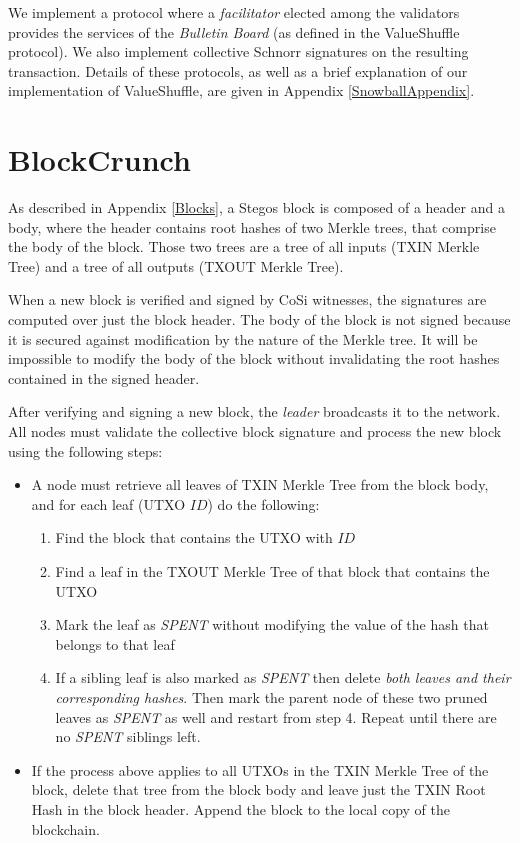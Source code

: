 \documentclass[a4paper, 10pt, conference]{ieeeconf}
\begin{document}
We implement a protocol where a \textit{facilitator} elected among the validators provides the services of the \textit{Bulletin Board} (as defined in the ValueShuffle protocol). We also implement collective Schnorr signatures\cite{c22} on the resulting transaction. Details of these protocols, as well as a brief explanation of our implementation of ValueShuffle, are given in Appendix \ref{SnowballAppendix}.

\section{BlockCrunch}\label{Pruning}

As described in Appendix \ref{Blocks}, a Stegos block is composed of a header and a body, where the header contains root hashes of two Merkle trees, that comprise the body of the block. Those two trees are a tree of all inputs (TXIN Merkle Tree) and a tree of all outputs (TXOUT Merkle Tree). 

When a new block is verified and signed by CoSi witnesses, the signatures are computed over just the block header. The body of the block is not signed because it is secured against modification by the nature of the Merkle tree. It will be impossible to modify the body of the block without invalidating the root hashes contained in the signed header.

After verifying and signing a new block, the \textit{leader} broadcasts it to the network. All nodes must validate the collective block signature and process the new block using the following steps:

\begin{itemize}
	\item {A node must retrieve all leaves of TXIN Merkle Tree from the block body, and for each leaf (UTXO $ID$) do the following:
	\begin{enumerate}
		\item {Find the block that contains the UTXO with $ID$}
		   \item {Find a leaf in the TXOUT Merkle Tree of that block that contains the UTXO}
		\item {Mark the leaf as \textit{SPENT} without modifying the value of the hash that belongs to that leaf}
		\item {If a sibling leaf is also marked as \textit{SPENT} then delete \textit{both leaves and their corresponding hashes}. Then mark the parent node of these two pruned leaves as \textit{SPENT} as well and restart from step 4. Repeat until there are no \textit{SPENT} siblings left.}
	\end{enumerate}} 
	\item {If the process above applies to all UTXOs in the TXIN Merkle Tree of the block, delete that tree from the block body and leave just the TXIN Root Hash in the block header. Append the block to the local copy of the blockchain.}
\end{itemize}
\end{document}
